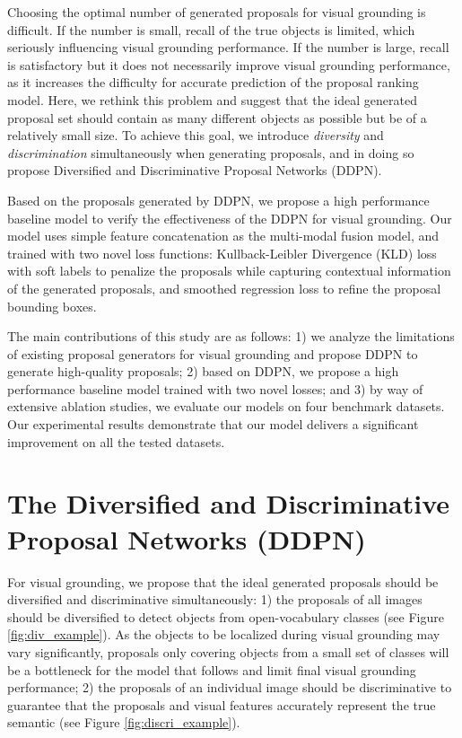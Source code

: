 \documentclass{article}
\begin{document}
Choosing the optimal number of generated proposals for visual grounding is difficult. If the number is small, recall of the true objects is limited, which seriously influencing visual grounding performance. If the number is large, recall is satisfactory but it does not necessarily improve visual grounding performance, as it increases the difficulty for accurate prediction of the proposal ranking model. Here, we rethink this problem and suggest that the ideal generated proposal set should contain as many different objects as possible but be of a relatively small size. To achieve this goal, we introduce \emph{diversity} and \emph{discrimination} simultaneously when generating proposals, and in doing so propose Diversified and Discriminative Proposal Networks (DDPN).

Based on the proposals generated by DDPN, we propose a high performance baseline model to verify the effectiveness of the DDPN for visual grounding. Our model uses simple feature concatenation as the multi-modal fusion model, and trained with two novel loss functions: Kullback-Leibler Divergence (KLD) loss with soft labels to penalize the proposals while capturing contextual information of the generated proposals, and smoothed  regression loss to refine the proposal bounding boxes.

The main contributions of this study are as follows: 1) we analyze the limitations of existing proposal generators for visual grounding and propose DDPN to generate high-quality proposals; 2) based on DDPN, we propose a high performance baseline model trained with two novel losses; and 3) by way of extensive ablation studies, we evaluate our models on four benchmark datasets. Our experimental results demonstrate that our model delivers a significant improvement on all the tested datasets.

\section{The Diversified and Discriminative Proposal Networks (DDPN)}\label{sec:ddrp}

For visual grounding, we propose that the ideal generated proposals should be diversified and discriminative simultaneously: 1) the proposals of all images should be diversified to detect objects from open-vocabulary classes (see Figure \ref{fig:div_example}). As the objects to be localized during visual grounding may vary significantly, proposals only covering objects from a small set of classes will be a bottleneck for the model that follows and limit final visual grounding performance; 2) the proposals of an individual image should be discriminative to guarantee that the proposals and visual features accurately represent the true semantic (see Figure \ref{fig:discri_example}).
\end{document}
